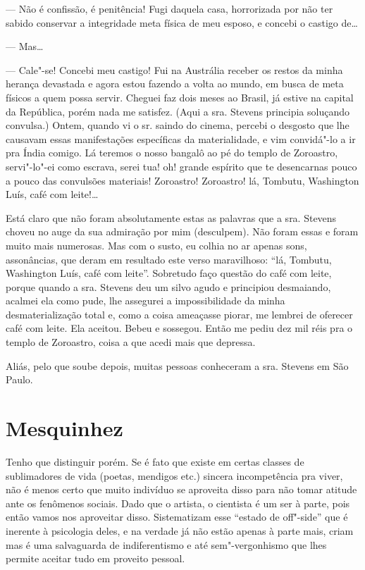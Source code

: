 --- Não é confissão, é penitência! Fugi daquela casa, horrorizada por
não ter sabido conservar a integridade meta física de meu esposo, e
concebi o castigo de\ldots{}

--- Mas\ldots{}

--- Cale"-se! Concebi meu castigo! Fui na Austrália receber os restos da
minha herança devastada e agora estou fazendo a volta ao mundo, em busca
de meta físicos a quem possa servir. Cheguei faz dois meses ao Brasil,
já estive na capital da República, porém nada me satisfez. (Aqui a sra.
Stevens principia soluçando convulsa.) Ontem, quando vi o sr. saindo do
cinema, percebi o desgosto que lhe causavam essas manifestações
específicas da materialidade, e vim convidá"-lo a ir pra Índia comigo. Lá
teremos o nosso bangalô ao pé do templo de Zoroastro, servi"-lo"-ei como
escrava, serei tua! oh! grande espírito que te desencarnas pouco a pouco
das convulsões materiais! Zoroastro! Zoroastro! lá, Tombutu, Washington
Luís, café com leite!\ldots{}

Está claro que não foram absolutamente estas as palavras que a sra.
Stevens choveu no auge da sua admiração por mim (desculpem). Não foram
essas e foram muito mais numerosas. Mas com o susto, eu colhia no ar
apenas sons, assonâncias, que deram em resultado este verso maravilhoso:
``lá, Tombutu, Washington Luís, café com leite''. Sobretudo faço questão
do café com leite, porque quando a sra. Stevens deu um silvo agudo e
principiou desmaiando, acalmei ela como pude, lhe assegurei a
impossibilidade da minha desmaterialização total e, como a coisa
ameaçasse piorar, me lembrei de oferecer café com leite. Ela aceitou.
Bebeu e sossegou. Então me pediu dez mil réis pra o templo de Zoroastro,
coisa a que acedi mais que depressa.

Aliás, pelo que soube depois, muitas pessoas conheceram a sra. Stevens
em São Paulo.

\chapter{Mesquinhez}

Tenho que distinguir porém. Se é fato que existe em certas classes de
sublimadores de vida (poetas, mendigos etc.) sincera incompetência pra
viver, não é menos certo que muito indivíduo se aproveita disso para não
tomar atitude ante os fenômenos sociais. Dado que o artista, o cientista
é um ser à parte, pois então vamos nos aproveitar disso. Sistematizam
esse ``estado de off"-side'' que é inerente à psicologia deles, e na
verdade já não estão apenas à parte mais, criam mas é uma salvaguarda de
indiferentismo e até sem"-vergonhismo que lhes permite aceitar tudo em
proveito pessoal.

